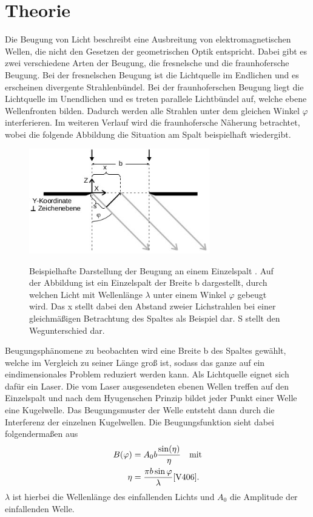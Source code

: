 \section{Theorie}
Die Beugung von Licht beschreibt eine Ausbreitung von elektromagnetischen Wellen,
die nicht den Gesetzen der geometrischen Optik entspricht. Dabei gibt es zwei verschiedene
Arten der Beugung, die fresnelsche und die fraunhofersche Beugung. Bei der fresnelschen
Beugung ist die Lichtquelle im Endlichen und es erscheinen divergente Strahlenbündel.
Bei der fraunhoferschen Beugung  liegt die Lichtquelle im Unendlichen und es treten
parallele Lichtbündel auf, welche ebene Wellenfronten bilden. Dadurch werden alle
Strahlen unter dem gleichen Winkel $\varphi$ interferieren. Im weiteren Verlauf  wird
die fraunhofersche Näherung betrachtet, wobei die folgende Abbildung die Situation am Spalt 
beispielhaft wiedergibt.
\begin{figure}[H]
    \centering
    \includegraphics[width=0.7\textwidth]{images/spalt.jpg}
    \label{fig:1}
    \caption{Beispielhafte Darstellung der Beugung an einem Einzelspalt \cite{V406}.
    Auf der Abbildung ist ein Einzelspalt der Breite b dargestellt, durch welchen 
    Licht mit Wellenlänge $\lambda$ unter einem Winkel $\varphi$ gebeugt wird. Das x stellt dabei
    den Abstand zweier Lichstrahlen bei einer gleichmäßigen Betrachtung des Spaltes als Beispiel dar.
    S stellt den Wegunterschied dar.
    }
\end{figure}
\justifying Beugungsphänomene zu beobachten wird eine  Breite b des Spaltes gewählt, welche  im Vergleich zu
seiner Länge groß ist, sodass das ganze auf ein eindimensionales Problem reduziert werden kann.
Als Lichtquelle eignet sich dafür ein Laser. Die vom Laser ausgesendeten ebenen Wellen
treffen auf den Einzelspalt und nach dem Hyugenschen Prinzip bildet jeder Punkt einer Welle
eine Kugelwelle. Das Beugungsmuster der Welle entsteht dann durch die Interferenz der einzelnen
Kugelwellen. Die Beugungsfunktion sieht dabei folgendermaßen aus
\begin{align}
    B(\varphi) &= A_0 b \frac{\sin (\eta)}{\eta}  \label{eq:1} \quad \text{mit}\\
    \eta &= \frac{\pi b \sin \varphi}{\lambda} \label{eq:2} \text{\cite{V406}} .
\end{align}
$\lambda$ ist hierbei die Wellenlänge des einfallenden Lichts und $A_0$ die Amplitude
der einfallenden Welle.

